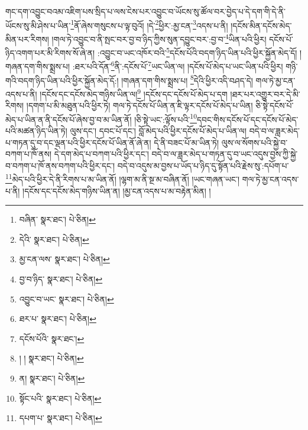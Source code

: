 གང་དག་འབྱུང་བའམ་འཇིག་པས་སྲིད་པ་ལས་ངེས་པར་འབྱུང་བ་ཡོངས་སུ་ཚོལ་བར་བྱེད་པ་དེ་དག་གི་དེ་ནི་ཡོངས་སུ་མི་ཤེས་པ་ཡིན་\footnote{བཞིན་  སྣར་ཐང་།  པེ་ཅིན། }ནོ་ཞེས་གསུངས་པ་ལྟ་བུའོ། །དེ་\footnote{དེའི་  སྣར་ཐང་།  པེ་ཅིན། }ཕྱིར་:མྱ་ངན་\footnote{མྱ་ངན་ལས་  སྣར་ཐང་།  པེ་ཅིན། }འདས་པ་ནི། །དངོས་མིན་དངོས་མེད་མིན་པར་རིགས། །གལ་ཏེ་འབྱུང་བ་ནི་སྤང་བར་བྱ་བ་ཉིད་ཀྱིས་སུན་དབྱུང་བར་:བྱ་བ་\footnote{བྱ་བ་ཉིད་  སྣར་ཐང་།  པེ་ཅིན། }ཡིན་པའི་ཕྱིར། དངོས་པོ་ཉིད་འགག་པར་མི་རིགས་སོ་ཞེ་ན། :འབྱུང་བ་ཡང་འཁོར་བའི་\footnote{འབྱུང་བ་ཡང་  སྣར་ཐང་།  པེ་ཅིན། }དངོས་པོའི་བདག་ཉིད་ཡིན་པའི་ཕྱིར་སྐྱོན་མེད་དོ། །གཞན་དག་གིས་སྨྲས་པ། :ཐར་པའི་དོན་\footnote{ཐར་པ་  སྣར་ཐང་།  པེ་ཅིན། }ནི་:དངོས་པོ་\footnote{དངོས་པོའི་  སྣར་ཐང་། }ཡང་ཡིན་ལ། །དངོས་པོ་མེད་པ་ཡང་ཡིན་པའི་ཕྱིར། གཉི་གའི་བདག་ཉིད་ཡིན་པའི་ཕྱིར་སྐྱོན་མེད་དོ:། །གཞན་དག་གིས་སྨྲས་པ། \footnote{། །   སྣར་ཐང་།  པེ་ཅིན། }དེའི་ཕྱིར་འདི་བཤད་དེ། གལ་ཏེ་མྱ་ངན་འདས་པ་ནི། །དངོས་དང་དངོས་མེད་གཉིས་ཡིན་ལ།\footnote{ན།  སྣར་ཐང་།  པེ་ཅིན། } །དངོས་དང་དངོས་པོ་མེད་པ་དག །ཐར་པར་འགྱུར་བར་དེ་མི་རིགས། །དགག་པ་མི་མཐུན་པའི་ཕྱིར་ཏེ། གལ་ཏེ་དངོས་པོ་ཡིན་ན་ཇི་ལྟར་དངོས་པོ་མེད་པ་ཡིན། ཅི་སྟེ་དངོས་པོ་མེད་པ་ཡིན་ན་ནི་དངོས་པོ་ཞེས་བྱ་བ་མ་ཡིན་ནོ། །ཅི་སྟེ་ཡང་:ལྟོས་པའི་\footnote{སྟོང་པའི་  སྣར་ཐང་།  པེ་ཅིན། }དབང་གིས་དངོས་པོ་དང་དངོས་པོ་མེད་པའི་མཚན་ཉིད་ཡིན་ཏེ། ལུས་དང་། དབང་པོ་དང་། བློ་མེད་པའི་ཕྱིར་དངོས་པོ་མེད་པ་ཡིན་ལ། བདེ་བ་ལ་ཟླར་མེད་པ་གཏན་དུ་བ་དང་ལྡན་པའི་ཕྱིར་དངོས་པོ་ཡིན་ནོ་ཞེ་ན། དེ་ནི་བཟང་པོ་མ་ཡིན་ཏེ། ལུས་ལ་སོགས་པའི་སྐྱེ་བ་བཀག་པ་ཁོ་ནས། དེ་དག་མེད་པ་བཀག་པའི་ཕྱིར་དང་། བདེ་བ་ལ་ཟླར་མེད་པ་གཏན་དུ་བ་ཡང་འདུས་བྱས་ཀྱི་སྐྱེ་བ་བཀག་པ་ཁོ་ནས་བཀག་པའི་ཕྱིར་དང་། བདེ་བ་འདུས་མ་བྱས་པ་ཡོད་པ་ཉིད་དུ་སྟོན་པའི་རྗེས་སུ་:དཔོག་པ་\footnote{དཔག་པ་  སྣར་ཐང་།  པེ་ཅིན། }མེད་པའི་ཕྱིར་དེ་ནི་རིགས་པ་མ་ཡིན་ནོ། །ལྷག་མ་ནི་སྔ་མ་བཞིན་ནོ། །ཡང་གཞན་ཡང་། གལ་ཏེ་མྱ་ངན་འདས་པ་ནི། །དངོས་དང་དངོས་མེད་གཉིས་ཡིན་ན། །མྱ་ངན་འདས་པ་མ་བརྟེན་མིན། །
